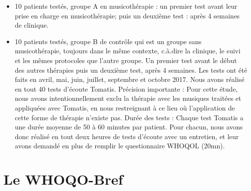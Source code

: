 \begin{itemize}
	\item 10 patients testés, groupe A en musicothérapie : un
          premier test avant leur prise en charge en musicothérapie;
          puis un deuxième test \textdegree{} : après 4 semaines de
          clinique.
	\item 10 patients testés, groupe B de contrôle qui est un groupe sans musicothérapie,
	toujours dans le même contexte, c.à.dire la clinique, le suivi et les mêmes protocoles que l'autre groupe. Un premier test avant
	le début des autres thérapies puis un deuxième test, après 4 semaines. 
	Les tests ont été faits en avril, mai, juin, juillet, septembre et octobre 2017.
	Nous avons réalisé en tout 40 tests d'écoute Tomatis. 
	Précision importante : Pour cette étude, nous avons intentionnellement exclu la thérapie avec les musiques traitées et appliquées avec Tomatis, en nous restreignant  à ce lieu où l'application de cette forme de thérapie n'existe pas.
	Durée des tests : Chaque test Tomatis a une durée  moyenne de 50 à 60  minutes par patient. Pour chacun, nous avons donc réalisé en tout deux heures de tests d'écoute avec un entretien, et leur avons demandé en plus de remplir le questionnaire WHOQOL (20mn).
\end{itemize}

\section{Le WHOQO-Bref}

